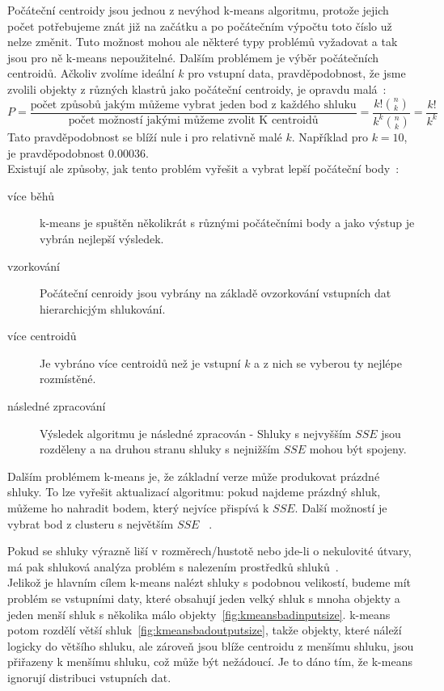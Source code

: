 Počáteční centroidy jsou jednou z nevýhod k-means algoritmu, protože jejich počet potřebujeme znát již na začátku a po počátečním výpočtu toto číslo už nelze změnit. Tuto možnost mohou ale některé typy problémů vyžadovat a tak jsou pro ně k-means nepoužitelné. Dalším problémem je výběr počátečních centroidů. Ačkoliv zvolíme ideální $k$ pro vstupní data, pravděpodobnost, že jsme zvolili objekty z různých klastrů jako počáteční centroidy, je opravdu malá~\cite{Tan05}: $$P = \frac{\mbox{počet způsobů jakým můžeme vybrat jeden bod z každého shluku}}{\mbox{počet možností jakými můžeme zvolit K centroidů}}=\frac{k!{n \choose k}}{k^k {n \choose k} }=\frac{k!}{k^k}$$ Tato pravděpodobnost se blíží nule i pro relativně malé $k$. Například pro $k=10$, je pravděpodobnost $0.00036$. \\
Existují ale způsoby, jak tento problém vyřešit a vybrat lepší počáteční body~\cite{Tan05}:
\begin{description}
\item[více běhů] k-means je spuštěn několikrát s různými počátečními body a jako výstup je vybrán nejlepší výsledek.
\item[vzorkování] Počáteční cenroidy jsou vybrány na základě ovzorkování vstupních dat hierarchicjým shlukování.
\item[více centroidů] Je vybráno více centroidů než je vstupní $k$ a z nich se vyberou ty nejlépe rozmístěné.
\item[následné zpracování] Výsledek algoritmu je následné zpracován - Shluky s nejvyšším $SSE$ jsou rozděleny a na druhou stranu shluky s nejnižším $SSE$ mohou být spojeny.
\end{description} 

Dalším problémem k-means je, že základní verze může produkovat prázdné shluky. To lze vyřešit aktualizací algoritmu: pokud najdeme prázdný shluk, můžeme ho nahradit bodem, který nejvíce přispívá k $SSE$. Další možností je vybrat bod z clusteru s největším $SSE$ ~\cite{Tan05}.

Pokud se shluky výrazně liší v rozměrech/hustotě nebo jde-li o nekulovité útvary, má pak shluková analýza problém s nalezením prostředků shluků~\cite{Tan05}. \\
Jelikož je hlavním cílem k-means nalézt shluky s podobnou velikostí, budeme mít problém se vstupními daty, které obsahují jeden velký shluk s mnoha objekty a jeden menší shluk s několika málo objekty~\autoref{fig:kmeansbadinputsize}. k-means potom rozdělí větší shluk~\autoref{fig:kmeansbadoutputsize}, takže objekty, které náleží logicky do většího shluku, ale zároveň jsou blíže centroidu z menšímu shluku, jsou přiřazeny k menšímu shluku, což může být nežádoucí. Je to dáno tím, že k-means ignorují distribuci vstupních dat.

